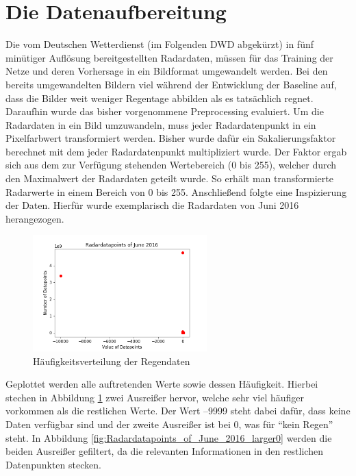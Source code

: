 \section{Die Datenaufbereitung}\label{die datenaufbereitung}
Die vom Deutschen Wetterdienst (im Folgenden DWD abgekürzt) in fünf minütiger Auflösung bereitgestellten Radardaten, müssen für das Training der Netze und deren Vorhersage in ein Bildformat umgewandelt werden.
Bei den bereits umgewandelten Bildern viel während der Entwicklung der Baseline auf, dass die Bilder weit weniger Regentage abbilden als es tatsächlich regnet. Daraufhin wurde das bisher vorgenommene Preprocessing evaluiert. Um die Radardaten in ein Bild umzuwandeln, muss jeder Radardatenpunkt in ein Pixelfarbwert transformiert werden. Bisher wurde dafür ein Sakalierungsfaktor berechnet mit dem jeder Radardatenpunkt multipliziert wurde. Der Faktor ergab sich aus dem zur Verfügung stehenden Wertebereich (0 bis 255), welcher durch den Maximalwert der Radardaten geteilt wurde. So erhält man transformierte Radarwerte in einem Bereich von 0 bis 255.
Anschließend folgte eine Inspizierung der Daten. Hierfür wurde exemplarisch die Radardaten von Juni 2016 herangezogen.

\begin{figure}[H]
    \centering
    \includegraphics[width=0.6\textwidth,angle=0]{abb/Radardatapoints_of_June_2016}
    \caption[Datenaufbereitung]{Häufigkeitsverteilung der Regendaten}
    \label{fig:Radardatapoints_of_June_2016}
\end{figure}

Geplottet werden alle auftretenden Werte sowie dessen Häufigkeit. 
Hierbei stechen in Abbildung \ref{fig:Radardatapoints_of_June_2016} zwei Ausreißer hervor, welche sehr viel häufiger vorkommen als die restlichen Werte. 
Der Wert –9999 steht dabei dafür, dass keine Daten verfügbar sind und der zweite Ausreißer ist bei 0, was für “kein Regen” steht. 
In Abbildung \ref{fig:Radardatapoints_of_June_2016_larger0} werden die beiden Ausreißer gefiltert, da die relevanten Informationen in den restlichen Datenpunkten stecken.

